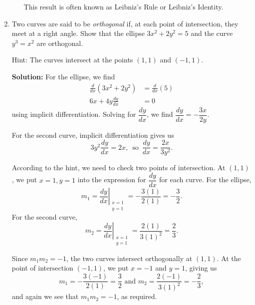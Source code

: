 \documentclass[letterpaper,12pt]{article}
\begin{document}
\begin{enumerate}
\begin{enumerate}
This result is often known as Leibniz's Rule or Leibniz's Identity.
\end{enumerate}

\bigskip

\item Two curves are said to be \textit{orthogonal} if, at each point of intersection, they meet at a right angle. Show that the ellipse $3x^2+2y^2=5$ and the curve $y^3=x^2$ are orthogonal.

Hint: The curves intersect at the points $(1,1)$ and $(-1,1)$.

\medskip

\textbf{Solution:} For the ellipse, we find
\begin{align*}
\frac{d}{dx}(3x^2+2y^2) & = \frac{d}{dx}(5)\\
6x+4y\frac{dy}{dx} & = 0
\end{align*}
using implicit differentiation. Solving for $\dfrac{dy}{dx}$, we find $\dfrac{dy}{dx} = -\dfrac{3x}{2y}$.

For the second curve, implicit differentiation gives us
\[
3y^2\frac{dy}{dx} = 2x, \,\text{ so } \, \dfrac{dy}{dx} = \dfrac{2x}{3y^2}.
\]



According to the hint, we need to check two points of intersection. At $(1,1)$, we put $x=1, y=1$ into the expression for $\dfrac{dy}{dx}$ for each curve. For the ellipse,
\[
m_1 = \left.\frac{dy}{dx}\right|_{\substack{x=1\\y=1}} = -\frac{3(1)}{2(1)} = -\frac{3}{2}.
\]
For the second curve, 
\[
m_2 = \left.\frac{dy}{dx}\right|_{\substack{x=1\\y=1}} = \frac{2(1)}{3(1)^2} = \frac{2}{3}.
\]

Since $m_1m_2 = -1$, the two curves intersect orthogonally at $(1,1)$. At the point of intersection $(-1,1)$, we put $x=-1$ and $y=1$, giving us
\[
m_1 = -\frac{3(-1)}{2(1)} = \frac{3}{2} \text{ and } m_2 = \frac{2(-1)}{3(1)^2} = -\frac{2}{3},
\]
and again we see that $m_1m_2=-1$, as required.
 \end{enumerate}
\end{document}
